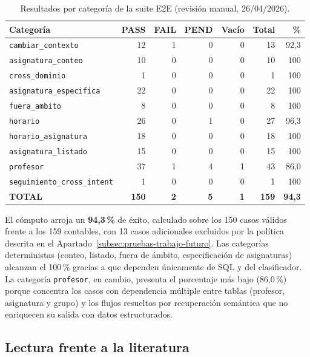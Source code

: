 \begin{table}[hbtp]
\centering
\caption{Resultados por categoría de la suite E2E (revisión manual, 26/04/2026).}\label{tab:e2e-categorias}
\begin{tabular}{lrrrrrr}
\hline
\textbf{Categoría} & \textbf{PASS} & \textbf{FAIL} & \textbf{PEND} & \textbf{Vacío} & \textbf{Total} & \textbf{\%} \\
\hline
\texttt{cambiar\_contexto} & 12 & 1 & 0 & 0 & 13 & 92,3 \\
\texttt{asignatura\_conteo} & 10 & 0 & 0 & 0 & 10 & 100 \\
\texttt{cross\_dominio} & 1 & 0 & 0 & 0 & 1 & 100 \\
\texttt{asignatura\_especifica} & 22 & 0 & 0 & 0 & 22 & 100 \\
\texttt{fuera\_ambito} & 8 & 0 & 0 & 0 & 8 & 100 \\
\texttt{horario} & 26 & 0 & 1 & 0 & 27 & 96,3 \\
\texttt{horario\_asignatura} & 18 & 0 & 0 & 0 & 18 & 100 \\
\texttt{asignatura\_listado} & 15 & 0 & 0 & 0 & 15 & 100 \\
\texttt{profesor} & 37 & 1 & 4 & 1 & 43 & 86,0 \\
\texttt{seguimiento\_cross\_intent} & 1 & 0 & 0 & 0 & 1 & 100 \\
\hline
\textbf{TOTAL} & \textbf{150} & \textbf{2} & \textbf{5} & \textbf{1} & \textbf{159} & \textbf{94,3} \\
\hline
\end{tabular}
\end{table}

El cómputo arroja un \textbf{94,3\,\%} de éxito, calculado sobre los 150 casos válidos frente a los 159 contables, con 13 casos adicionales excluidos por la política descrita en el Apartado~\ref{subsec:pruebas-trabajo-futuro}. Las categorías deterministas (conteo, listado, fuera de ámbito, especificación de asignaturas) alcanzan el 100\,\% gracias a que dependen únicamente de SQL y del clasificador. La categoría \texttt{profesor}, en cambio, presenta el porcentaje más bajo (86,0\,\%) porque concentra los casos con dependencia múltiple entre tablas (profesor, asignatura y grupo) y los flujos resueltos por recuperación semántica que no enriquecen su salida con datos estructurados.

\subsection{Lectura frente a la literatura}\label{subsec:e2e-literatura}

